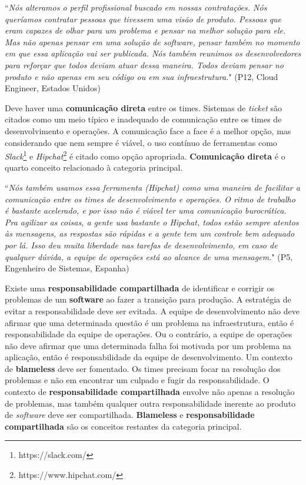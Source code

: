 \begin{mq}
``\emph{Nós alteramos o perfil profissional buscado em nossas contratações. Nós
queríamos contratar pessoas que tivessem uma visão de produto. Pessoas que eram
capazes de olhar para um problema e pensar na melhor solução para ele. Mas não
apenas pensar em uma solução de software, pensar também no momento em que essa
aplicação vai ser publicada. Nós também reunimos os desenvolvedores para
reforçar que todos deviam atuar dessa maneira. Todos deviam pensar no produto e
não apenas em seu código ou em sua infraestrutura.}" (P12, Cloud Engineer,
Estados Unidos)
\end{mq}

Deve haver uma {\bf comunicação direta} entre os times. Sistemas de {\it
ticket} são citados como um meio típico e inadequado de comunicação entre os
times de desenvolvimento e operações. A comunicação face a face é a melhor
opção, mas considerando que nem sempre é viável, o uso contínuo de ferramentas
como \emph{Slack}\footnote{https://slack.com/} e \emph{Hipchat}\footnote{https://www.hipchat.com/}
é citado como opção apropriada. {\bf Comunicação direta} é o quarto conceito
relacionado à categoria principal.

\begin{mq}
``\emph{Nós também usamos essa ferramenta ({\it Hipchat})
como uma maneira de facilitar a comunicação entre os times de desenvolvimento e
operações. O ritmo de trabalho é bastante acelerado, e por isso não é viável ter
uma comunicação burocrática. Pra agilizar as coisas, a gente usa bastante o
{\it Hipchat}, todos estão sempre atentos às mensagens, as respostas são
rápidas e a gente tem um controle bem adequado por lá. Isso deu muita liberdade
nas tarefas de desenvolvimento, em caso de qualquer dúvida, a equipe de
operações está ao alcance de uma mensagem.}" (P5, Engenheiro de Sistemas, Espanha)
\end{mq}

Existe uma {\bf responsabilidade compartilhada} de identificar e corrigir os
problemas de um {\bf software} ao fazer a transição para produção. A estratégia
de evitar a responsabilidade deve ser evitada. A equipe de desenvolvimento não
deve afirmar que uma determinada questão é um problema na infraestrutura, então
é responsabilidade da equipe de operações. Ou o contrário, a equipe de operações
não deve afirmar que uma determinada falha foi motivada por um problema na
aplicação, então é responsabilidade da equipe de desenvolvimento. Um contexto de
{\bf blameless} deve ser fomentado. Os times precisam focar na resolução dos
problemas e não em encontrar um culpado e fugir da responsabilidade. O contexto
de {\bf responsabilidade compartilhada} envolve não apenas a resolução de
problemas, mas também qualquer outra responsabilidade inerente ao produto de
{\it software} deve ser compartilhada. {\bf Blameless} e {\bf responsabilidade
compartilhada} são os conceitos restantes da categoria principal.

